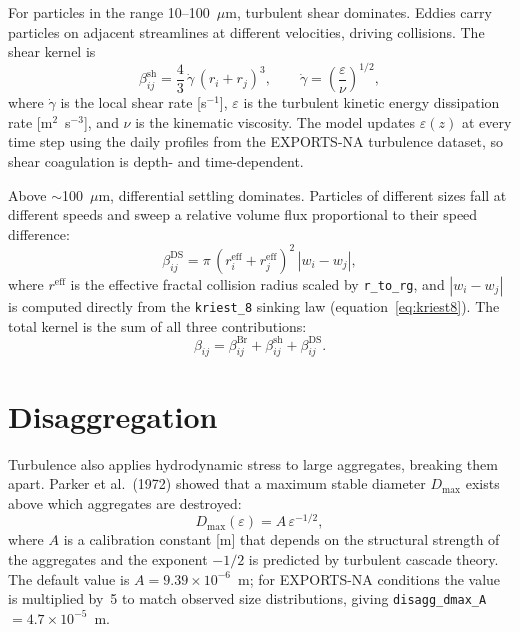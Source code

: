 \documentclass[12pt,a4paper]{report}
\numberwithin{equation}{chapter}
\begin{document}
For particles in the range 10--100~$\mu$m, turbulent shear dominates.
Eddies carry particles on adjacent streamlines at different velocities, driving
collisions. The shear kernel is
\begin{equation}
    \beta_{ij}^\mathrm{sh}
    = \frac{4}{3}\,\dot{\gamma}\,(r_i + r_j)^3,
    \qquad
    \dot{\gamma} = \left(\frac{\varepsilon}{\nu}\right)^{1/2},
    \label{eq:kern_sh}
\end{equation}
where $\dot{\gamma}$ is the local shear rate [s$^{-1}$], $\varepsilon$ is
the turbulent kinetic energy dissipation rate [m$^2$~s$^{-3}$], and $\nu$
is the kinematic viscosity. The model updates $\varepsilon(z)$ at every
time step using the daily profiles from the EXPORTS-NA turbulence dataset,
so shear coagulation is depth- and time-dependent.

Above $\sim$100~$\mu$m, differential settling dominates. Particles of
different sizes fall at different speeds and sweep a relative volume flux
proportional to their speed difference:
\begin{equation}
    \beta_{ij}^\mathrm{DS}
    = \pi\,(r_i^\mathrm{eff} + r_j^\mathrm{eff})^2\,|w_i - w_j|,
    \label{eq:kern_ds}
\end{equation}
where $r^\mathrm{eff}$ is the effective fractal collision radius scaled by
\texttt{r\_to\_rg}, and $|w_i - w_j|$ is computed directly from the
\texttt{kriest\_8} sinking law (equation~\ref{eq:kriest8}).
The total kernel is the sum of all three contributions:
\begin{equation}
    \beta_{ij} = \beta_{ij}^\mathrm{Br}
               + \beta_{ij}^\mathrm{sh}
               + \beta_{ij}^\mathrm{DS}.
    \label{eq:kern_total}
\end{equation}

\section{Disaggregation}

Turbulence also applies hydrodynamic stress to large aggregates, breaking them
apart. Parker et al.\ (1972) showed that a maximum stable diameter
$D_\mathrm{max}$ exists above which aggregates are destroyed:
\begin{equation}
    D_\mathrm{max}(\varepsilon) = A\,\varepsilon^{-1/2},
    \label{eq:dmax}
\end{equation}
where $A$ is a calibration constant [m] that depends on the structural
strength of the aggregates and the exponent $-1/2$ is predicted by
turbulent cascade theory. The default value is
$A = 9.39 \times 10^{-6}$~m; for EXPORTS-NA conditions the value is
multiplied by~5 to match observed size distributions, giving
\texttt{disagg\_dmax\_A}~$= 4.7 \times 10^{-5}$~m.
\end{document}
